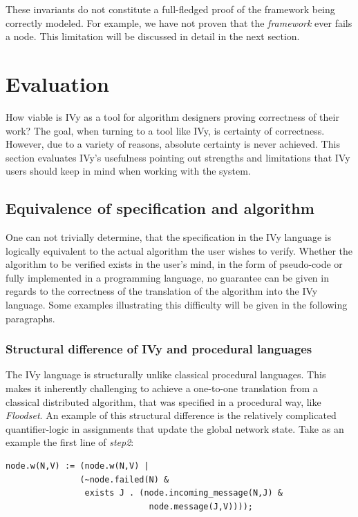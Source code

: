 \documentclass[fleqn]{article}
\begin{document}
These invariants do not constitute a full-fledged proof of the framework being correctly modeled. For example, we have not proven that the \textit{framework} ever fails a node. This limitation will be discussed in detail in the next section.

\section{Evaluation}
How viable is IVy as a tool for algorithm designers proving correctness
of their work? The goal, when turning to a tool like IVy, is certainty of
correctness. However, due to a variety of reasons, absolute certainty is never achieved.
This section evaluates IVy's usefulness pointing out strengths and limitations that IVy users should keep in mind
when working with the system.

\subsection{Equivalence of specification and algorithm}
One can not trivially determine, that the specification in the IVy language is logically equivalent to the actual algorithm the user wishes to verify. Whether the algorithm to be verified exists in the user's mind, in the form of pseudo-code or fully implemented in a programming language, no guarantee can be given in regards to the correctness of the translation of the algorithm into the IVy language. Some examples illustrating this difficulty will be given in the following paragraphs.

\subsubsection{Structural difference of IVy and procedural languages}
The IVy language is structurally unlike classical procedural languages. This makes it inherently challenging to achieve a one-to-one translation from a classical distributed algorithm, that was specified in a procedural way, like \textit{Floodset}. An example of this structural difference is the relatively complicated quantifier-logic in assignments that update the global network state. Take as an example the first line of \textit{step2}:

\begin{mdframed}[nobreak=true, backgroundcolor=light-gray, roundcorner=10pt,leftmargin=1, rightmargin=1, innerleftmargin=15, innertopmargin=15,innerbottommargin=15, outerlinewidth=1, linecolor=light-gray]
\begin{lstlisting}
node.w(N,V) := (node.w(N,V) |
               (~node.failed(N) &
                exists J . (node.incoming_message(N,J) &
                             node.message(J,V))));
\end{lstlisting}
\end{mdframed}
\end{document}

